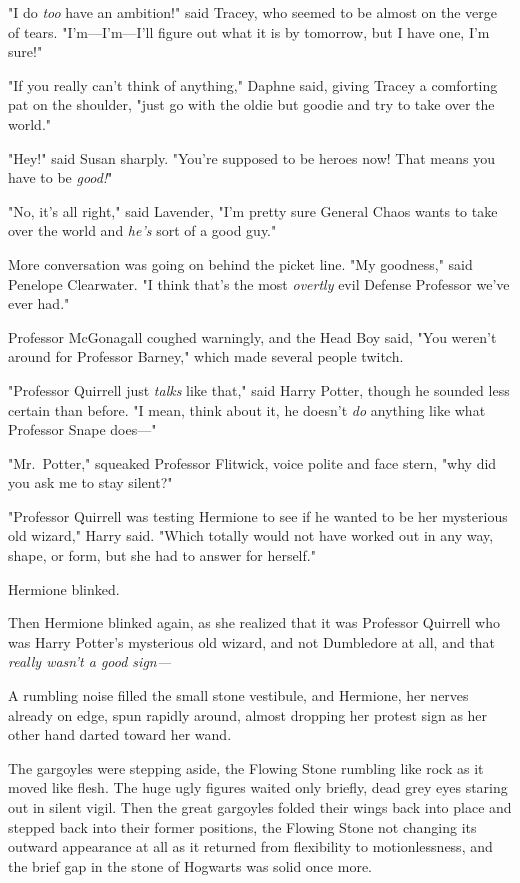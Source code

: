 "I do \emph{too} have an ambition!" said Tracey, who seemed to be almost on the
verge of tears. "I'm---I'm---I'll figure out what it is by tomorrow, but I have
one, I'm sure!"

"If you really can't think of anything," Daphne said, giving Tracey a
comforting pat on the shoulder, "just go with the oldie but goodie and try to
take over the world."

"Hey!" said Susan sharply. "You're supposed to be heroes now! That means you
have to be \emph{good!}"

"No, it's all right," said Lavender, "I'm pretty sure General Chaos wants to
take over the world and \emph{he's} sort of a good guy."

More conversation was going on behind the picket line. "My goodness," said
Penelope Clearwater. "I think that's the most \emph{overtly} evil Defense
Professor we've ever had."

Professor McGonagall coughed warningly, and the Head Boy said, "You weren't
around for Professor Barney," which made several people twitch.

"Professor Quirrell just \emph{talks} like that," said Harry Potter, though he
sounded less certain than before. "I mean, think about it, he doesn't \emph{do}
anything like what Professor Snape does\mbox{---}"

"Mr.~Potter," squeaked Professor Flitwick, voice polite and face stern, "why
did you ask me to stay silent?"

"Professor Quirrell was testing Hermione to see if he wanted to be her
mysterious old wizard," Harry said. "Which totally would not have worked out in
any way, shape, or form, but she had to answer for herself."

Hermione blinked.

Then Hermione blinked again, as she realized that it was Professor Quirrell who
was Harry Potter's mysterious old wizard, and not Dumbledore at all, and that
\emph{really wasn't a good sign---}

A rumbling noise filled the small stone vestibule, and Hermione, her nerves
already on edge, spun rapidly around, almost dropping her protest sign as her
other hand darted toward her wand.

The gargoyles were stepping aside, the Flowing Stone rumbling like rock as it
moved like flesh. The huge ugly figures waited only briefly, dead grey eyes
staring out in silent vigil. Then the great gargoyles folded their wings back
into place and stepped back into their former positions, the Flowing Stone not
changing its outward appearance at all as it returned from flexibility to
motionlessness, and the brief gap in the stone of Hogwarts was solid once more.

